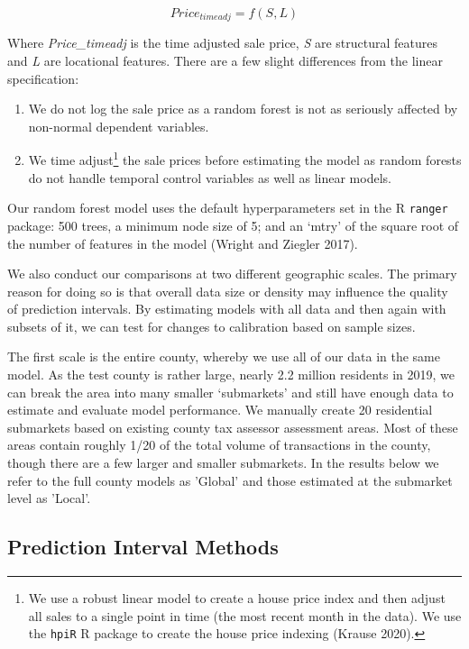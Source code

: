 \documentclass[colTwo]{anon}
\theoremstyle{definition}
\begin{document}
\[Price_{timeadj} = f(S, L) \]

Where \textit{Price\_timeadj} is the time adjusted sale price, \textit{S} are structural features and \textit{L} are locational features. There are a few slight differences from the linear specification:

\begin{enumerate}
\item We do not log the sale price as a random forest is not as seriously affected by non-normal dependent variables.
\item We time adjust\footnote{We use a robust linear model to create a house price index and then adjust all sales to a single point in time (the most recent month in the data).  We use the \texttt{hpiR} R package to create the house price indexing (Krause 2020). } the sale prices before estimating the model as random forests do not handle temporal control variables as well as linear models. 
\end{enumerate}

Our random forest model uses the default hyperparameters set in the R \texttt{ranger} package: 500 trees, a minimum node size of 5; and an ‘mtry’ of the square root of the number of features in the model (Wright and Ziegler 2017). 

We also conduct our comparisons at two different geographic scales.  The primary reason for doing so is that overall data size or density may influence the quality of prediction intervals.  By estimating models with all data and then again with subsets of it, we can test for changes to calibration based on sample sizes.  

The first scale is the entire county, whereby we use all of our data in the same model.  As the test county is rather large, nearly 2.2 million residents in 2019, we can break the area into many smaller ‘submarkets’ and still have enough data to estimate and evaluate model performance.  We manually create 20 residential submarkets based on existing county tax assessor assessment areas.  Most of these areas contain roughly 1/20 of the total volume of transactions in the county, though there are a few larger and smaller submarkets. In the results below we refer to the full county models as 'Global' and those estimated at the submarket level as 'Local'. 
 
\subsection{Prediction Interval Methods}
\end{document}
